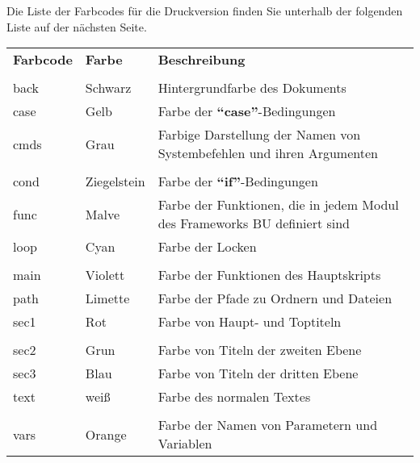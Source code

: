 \documentclass[a4paper,10pt]{article}
\begin{document}
    \begin{justify}
        Die Liste der Farbcodes für die Druckversion finden Sie unterhalb der folgenden Liste auf der nächsten Seite.
    \end{justify}

    \begin{justify}
        \begin{tabular}{lll}
            \textbf{Farbcode} & \textbf{Farbe}          & \textbf{Beschreibung}\\\\

            \color{text}back  & \color{text}Schwarz     & \color{text}Hintergrundfarbe des Dokuments\\
            \color{case}case  & \color{case}Gelb        & \color{case}Farbe der \textbf{``case''}-Bedingungen\\
            \color{cmds}cmds  & \color{cmds}Grau        & \color{cmds}Farbige Darstellung der Namen von Systembefehlen und ihren Argumenten\\\\

            \color{cond}cond  & \color{cond}Ziegelstein & \color{cond}Farbe der \textbf{``if''}-Bedingungen\\
            \color{func}func  & \color{func}Malve       & \color{func}Farbe der Funktionen, die in jedem Modul des Frameworks BU definiert sind\\
            \color{loop}loop  & \color{loop}Cyan        & \color{loop}Farbe der Locken\\\\

            \color{main}main  & \color{main}Violett     & \color{main}Farbe der Funktionen des Hauptskripts\\
            \color{path}path  & \color{path}Limette     & \color{path}Farbe der Pfade zu Ordnern und Dateien\\
            \color{sec1}sec1  & \color{sec1}Rot         & \color{sec1}Farbe von Haupt- und Toptiteln\\\\

            \color{sec2}sec2  & \color{sec2}Grun        & \color{sec2}Farbe von Titeln der zweiten Ebene\\
            \color{sec3}sec3  & \color{sec3}Blau        & \color{sec3}Farbe von Titeln der dritten Ebene\\
            \color{text}text  & \color{text}weiß        & \color{text}Farbe des normalen Textes\\\\

            \color{vars}vars  & \color{vars}Orange      & \color{vars}Farbe der Namen von Parametern und Variablen\\
        \end{tabular}
    \end{justify}
\end{document}
